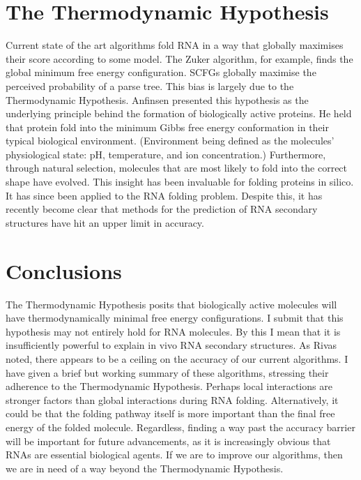 \documentclass[12pt, a4paper]{article}
\begin{document}
\section{The Thermodynamic Hypothesis}
Current state of the art algorithms fold RNA in a way that globally maximises their score according to some model. The Zuker algorithm, for example, finds the global minimum free energy configuration. SCFGs globally maximise the perceived probability of a parse tree. This bias is largely due to the Thermodynamic Hypothesis. Anfinsen \cite{anfinsen1973principles} presented this hypothesis as the underlying principle behind the formation of biologically active proteins. He held that protein fold into the minimum Gibbs free energy conformation in their typical biological environment. (Environment being defined as the molecules' physiological state: pH, temperature, and ion concentration.) Furthermore, through natural selection, molecules that are most likely to fold into the correct shape have evolved. This insight has been invaluable for folding proteins in silico. It has since been applied to the RNA folding problem. Despite this, it has recently become clear that methods for the prediction of RNA secondary structures have hit an upper limit in accuracy.


\section{Conclusions}

The Thermodynamic Hypothesis posits that biologically active molecules will have thermodynamically minimal free energy configurations. I submit that this hypothesis may not entirely hold for RNA molecules. By this I mean that it is insufficiently powerful to explain in vivo RNA secondary structures. As Rivas \cite{rivas2013four} noted, there appears to be a ceiling on the accuracy of our current algorithms. I have given a brief but working summary of these algorithms, stressing their adherence to the Thermodynamic Hypothesis. Perhaps local interactions are stronger factors than global interactions during RNA folding. Alternatively, it could be that the folding pathway itself is more important than the final free energy of the folded molecule. Regardless, finding a way past the accuracy barrier will be important for future advancements, as it is increasingly obvious that RNAs are essential biological agents. If we are to improve our algorithms, then we are in need of a way beyond the Thermodynamic Hypothesis.







\end{document}
